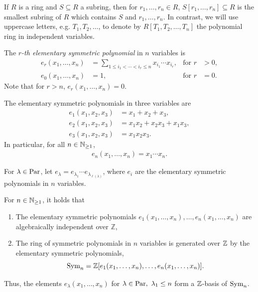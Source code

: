 \documentclass[11pt]{amsart}
\begin{document}
If \(R\) is a ring and \(S \subseteq R\) a subring, then for \(r_1,\dots,r_n \in R\), \(S[r_1,\dots,r_n] \subseteq R\) is the smallest subring of \(R\) which contains \(S\) and \(r_1,\dots,r_n\). In contrast, we will use uppercase letters, e.g. \(T_1,T_2,\dots\), to denote by $R[T_1, T_2, \dots, T_n]$ the polynomial ring in independent variables.
\begin{defin}
    The \emph{$r$-th elementary symmetric polynomial} in $n$ variables is
     \begin{align*}
         e_r(x_1, \dots, x_n) &= \sum_{1 \leq i_1 < \cdots < i_r \leq n} x_{i_1}\cdots x_{i_r} ,  &\text{for } r &> 0, \\
         e_0(x_1, \dots, x_n)&=1,  &\text{for } r &= 0.
     \end{align*}
     Note that for \( r > n\), \(e_r(x_1,\dots,x_n) = 0\).
\end{defin}

\begin{eg}
    The elementary symmetric polynomials in three variables are 
    \begin{align*}
        e_1(x_1, x_2, x_3)&=x_1+x_2+x_3, \\ 
    e_2(x_1, x_2, x_3)&=x_1x_2+x_2x_3+x_1x_3, \\
    e_3(x_1, x_2, x_3)&=x_1x_2x_3.
    \end{align*}
     In particular, for all $n \in \mathbb{N}_{\geq 1}$, 
     \begin{align}
         e_n(x_1, \dots, x_n)=x_1\cdots x_n.
     \end{align}
\end{eg}

For $\lambda \in \mathrm{Par}$, let $e_\lambda=e_{\lambda_1}\cdots e_{\lambda_{\ell(\lambda)}}$, where $e_i$ are the elementary symmetric polynomials in $n$ variables. 
\begin{prop}\label{prop:ftsp}
For $n \in \mathbb{N}_{\geq 1}$, it holds that
\begin{enumerate}
    \item The elementary symmetric polynomials $e_1(x_1,\dots,x_n),\dots,e_n(x_1,\dots,x_n)$ are algebraically independent over \(\mathbb{Z}\),
    \item The ring of symmetric polynomials in $n$ variables is generated over $\mathbb{Z}$ by the elementary symmetric polynomials,\[\mathrm{Sym}_n=\mathbb{Z}[e_1(x_1,\dots,x_n),\ldots,e_n(x_1,\ldots,x_n)].\]
\end{enumerate}
Thus, the elements $e_\lambda(x_1,\dots,x_n)$ for $\lambda \in \mathrm{Par},\ \lambda_1 \leq n$ form a $\mathbb{Z}$-basis of $\mathrm{Sym}_n$.
\end{prop}
\end{document}
